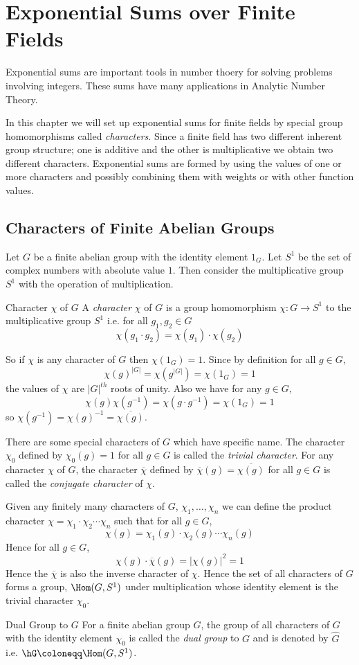\chapter{Exponential Sums over Finite Fields}
Exponential sums are important tools in number thoery for solving problems involving integers. These sums have many applications in Analytic Number Theory. 

In this chapter we will set up exponential sums for finite fields by special group homomorphisms called \textit{characters}. Since a finite field has two different inherent group structure; one is additive and the other is multiplicative we obtain two different characters. Exponential sums are formed by using the values of one or more characters and possibly combining them with weights or with other function values.
\section{Characters of Finite Abelian Groups}
Let $G$ be a finite abelian group with the identity element $1_G$. Let $S^1$ be the set of complex numbers with absolute value $1$. Then consider the multiplicative group $S^1$ with the operation of multiplication. 
\begin{Definition}{Character $\chi$ of $G$}{}
  A \textit{character} $\chi$ of $G$ is a group homomorphism $\chi:G\to S^1$ to the multiplicative group $S^1$ i.e. for all $g_1,g_2\in G$ $$\chi(g_1\cdot g_2)=\chi(g_1)\cdot \chi(g_2)$$
\end{Definition}

So if $\chi$ is any character of $G$ then $\chi(1_G)=1$. Since by definition for all $g\in G$, $$\chi(g)^{|G|}=\chi(g^{|G|})=\chi(1_G)=1$$ the values of $\chi$ are $|G|^{th}$ roots of unity. Also we have for any $g\in G$, $$\chi(g)\chi(g^{-1})=\chi(g\cdot g^{-1})=\chi(1_G)=1$$ so $\chi(g^{-1})=\chi(g)^{-1}=\overline{\chi(g)}$.

There are some special characters of $G$ which have specific name. The character $\chi_0$ defined by $\chi_0(g)=1$ for all $g\in G$ is called the \textit{trivial character}. For any character $\chi$ of $G$, the character $\overline{\chi}$ defined by $\overline{\chi}(g)=\overline{\chi(g)}$ for all $g\in G$ is called the \textit{conjugate character} of $\chi$. 

Given any finitely many characters of $G$, $\chi_1,\dots, \chi_n$ we can define the product character $\chi=\chi_1\cdot \chi_2\cdots \chi_n$ such that for all $g\in G$, $$\chi(g)=\chi_1(g)\cdot \chi_2(g)\cdots \chi_n(g)$$
Hence for all $g\in G$, $$\chi(g)\cdot \overline{\chi}(g)=|\chi(g)|^2=1$$Hence the $\overline{\chi}$ is also the inverse character of $\chi$. Hence the set of all characters of $G$ forms a group, $\Hom(G,S^1)$ under multiplication whose identity element is the trivial character $\chi_0$. 
\begin{Definition}{Dual Group to $G$}{}
  For a finite abelian group $G$, the group of all characters of $G$ with the identity element $\chi_0$ is called the \textit{dual group} to $G$ and is denoted by $\widehat{G}$ i.e. $\hG\coloneqq \Hom(G,S^1)$.
\end{Definition}

